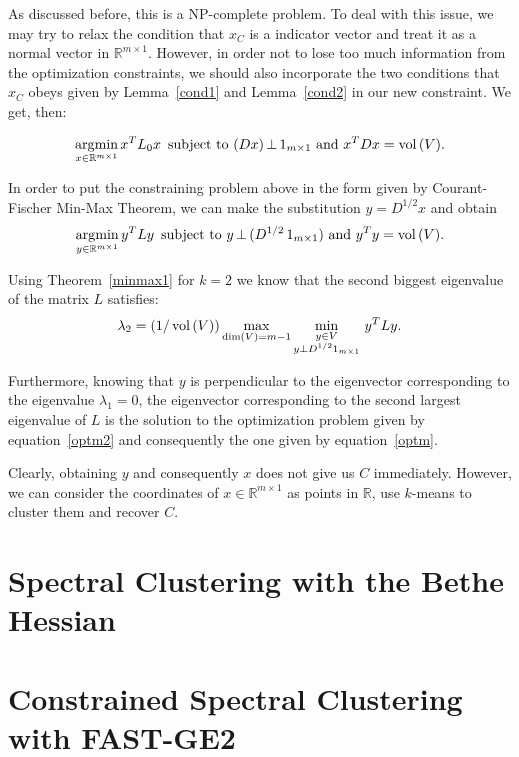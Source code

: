 As discussed before, this is a NP-complete problem.
To deal with this issue, we may try to relax the condition that $x_C$ is a indicator vector and treat it as a normal vector in $\mathbb R^{m \times 1}$.
However, in order not to lose too much information from the optimization constraints, we should also incorporate the two conditions that $x_C$ obeys given by Lemma~\ref{cond1} and Lemma~\vref{cond2} in our new constraint. We get, then:

\begin{equation}
   \operatorname*{\arg\!\min}_{x \in \mathbb R^{m \times 1}} {x}^TL_0{x}\,\text{ subject to } (Dx)\, \bot \, 1_{m \times 1}  \text{ and } x^T D x = \operatorname*{vol\,} (V).
\end{equation}

In order to put the constraining problem above in the form given by Courant-Fischer Min-Max Theorem, we can make the substitution $y = D^{1/2}x$ and obtain
\begin{equation} \label{optm}
   \operatorname*{\arg\!\min}_{y \in \mathbb R^{m \times 1}} y^TLy \,\text{ subject to } y \, \bot \, (D^{1/2} \,1_{m \times 1}) \text{ and } y^T y = \operatorname*{vol\,} (V).
\end{equation}

Using Theorem~\vref{minmax1} for $k = 2$ we know that the second biggest eigenvalue of the matrix $L$ satisfies:
\begin{equation}\label{optm2}
   \lambda_2 = \left( 1/\operatorname*{vol\,}(V) \right) \max_{\dim (V) = m-1} \min_{\substack{y \in V \\ y \bot D^{1/2}1_{m \times 1}}} \, y^TLy.
\end{equation}

Furthermore, knowing that $y$ is perpendicular to the eigenvector corresponding to the eigenvalue $\lambda_1 = 0$, the eigenvector corresponding to the second largest eigenvalue of $L$ is the solution to the optimization problem given by equation~\ref{optm2} and consequently the one given by equation~\ref{optm}.

Clearly, obtaining $y$ and consequently $x$ does not give us $C$ immediately.
However, we can consider the coordinates of $x \in \mathbb R^{m \times 1}$ as points in $\mathbb R$, use $k$-means to cluster them and recover $C$.

\chapter{Spectral Clustering with the Bethe Hessian}


\chapter{Constrained Spectral Clustering with FAST-GE2}


